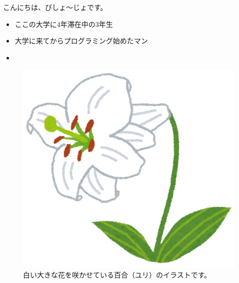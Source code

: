 \begin{frame}
	\frametitlesec
	こんにちは、びしょ〜じょです。
	\begin{itemize}
		\item ここの大学に4年滞在中の3年生
		\item 大学に来てからプログラミング始めたマン
		\item {}
	\end{itemize}
	\begin{figure}[H]
		\centering
		\includegraphics[height=.3\textheight]{flower_yuri.png}
		\caption{白い大きな花を咲かせている百合（ユリ）のイラストです。}
	\end{figure}
\end{frame}
